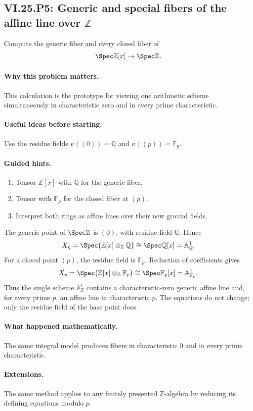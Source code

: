 \subsection*{VI.25.P5: Generic and special fibers of the affine line over \(\mathbb Z\)}
\begin{problem}\label{prob:vi25-p05}
Compute the generic fiber and every closed fiber of
\[
\Spec\mathbb Z[x]\to\Spec\mathbb Z.
\]
\end{problem}

\ifdefined\FullProblemDossiers
\paragraph{Why this problem matters.}
This calculation is the prototype for viewing one arithmetic scheme simultaneously in characteristic zero and in every prime characteristic.

\paragraph{Useful ideas before starting.}
Use the residue fields \(\kappa((0))=\mathbb Q\) and \(\kappa((p))=\mathbb F_p\).

\paragraph{Guided hints.}
\begin{enumerate}
\item Tensor \(\mathbb Z[x]\) with \(\mathbb Q\) for the generic fiber.
\item Tensor with \(\mathbb F_p\) for the closed fiber at \((p)\).
\item Interpret both rings as affine lines over their new ground fields.
\end{enumerate}

\begin{solution}
The generic point of \(\Spec\mathbb Z\) is \((0)\), with residue field \(\mathbb Q\).  Hence
\[
X_\eta
=
\Spec\bigl(\mathbb Z[x]\otimes_{\mathbb Z}\mathbb Q\bigr)
\cong
\Spec\mathbb Q[x]
=
\mathbb A^1_{\mathbb Q}.
\]
For a closed point \((p)\), the residue field is \(\mathbb F_p\).  Reduction of coefficients gives
\[
X_p
=
\Spec\bigl(\mathbb Z[x]\otimes_{\mathbb Z}\mathbb F_p\bigr)
\cong
\Spec\mathbb F_p[x]
=
\mathbb A^1_{\mathbb F_p}.
\]
Thus the single scheme \(\mathbb A^1_{\mathbb Z}\) contains a characteristic-zero generic affine line and, for every prime \(p\), an affine line in characteristic \(p\).  The equations do not change; only the residue field of the base point does.
\end{solution}

\paragraph{What happened mathematically.}
The same integral model produces fibers in characteristic \(0\) and in every prime characteristic.

\paragraph{Extensions.}
The same method applies to any finitely presented \(\mathbb Z\)-algebra by reducing its defining equations modulo \(p\).
\fi
